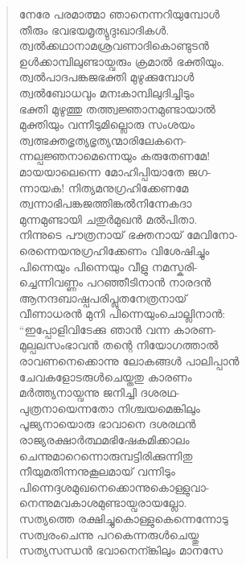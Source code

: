 \begin{verse}
നേരേ പരമാത്മാ ഞാനെന്നറിയുമ്പോള്‍\\
തീരും ഭവഭയമൃത്യുദുഃഖാദികള്‍.\\
ത്വല്‍ക്കഥാനാമശ്രവണാദികൊണ്ടുടന്‍\\
ഉള്‍ക്കാമ്പിലുണ്ടായ്വരും ക്രമാല്‍ ഭക്തിയും.\\
ത്വല്‍പാദപങ്കജഭക്തി മുഴുക്കുമ്പോള്‍\\
ത്വല്‍ബോധവും മനഃകാമ്പിലുദിച്ചിടും\\
ഭക്തി മുഴുത്തു തത്ത്വജ്ഞാനമുണ്ടായാല്‍\\
മുക്തിയും വന്നീടുമില്ലൊരു സംശയം\\
ത്വത്ഭക്തഭൃത്യഭൃത്യന്മാരിലേകനെ-\\
ന്നല്പജ്ഞനാമെന്നെയും കരുതേണമേ!\\
മായയാലെന്നെ മോഹിപ്പിയാതേ ജഗ-\\
ന്നായക! നിത്യമനുഗ്രഹിക്കേണമേ\\
ത്വന്നാഭിപങ്കജത്തിങ്കല്‍നിന്നേകദാ\\
മുന്നമുണ്ടായി ചതുര്‍മുഖന്‍ മല്‍പിതാ.\\
നിന്നുടെ പൗത്രനായ് ഭക്തനായ് മേവിനോ-\\
രെന്നെയനുഗ്രഹിക്കേണം വിശേഷിച്ചും\\
പിന്നെയും പിന്നെയും വീളു നമസ്കരി-\\
ച്ചെന്നിവണ്ണം പറഞ്ഞീടിനാന്‍ നാരദന്‍\\
ആനന്ദബാഷ്പപരിപ്ലുതനേത്രനായ്\\
വീണാധരന്‍ മുനി പിന്നെയുംചൊല്ലിനാന്‍:\\
“ഇപ്പോളിവിടേക്കു ഞാന്‍ വന്ന കാരണ-\\
മുല്പലസംഭാവന്‍ തന്റെ നിയോഗത്താല്‍\\
രാവണനെക്കൊന്നു ലോകങ്ങള്‍ പാലിപ്പാന്‍\\
ചേവകളോടരുള്‍ചെയ്തതു കാരണം\\
മര്‍ത്ത്യനായ്വന്നു ജനിച്ചി ദശരഥ-\\
പുത്രനായെന്നതോ നിശ്ചയമെങ്കിലും\\
പൂജ്യനായൊരു ഭാവാനെ ദശരഥന്‍\\
രാജ്യരക്ഷാര്‍ത്ഥമഭിഷേകമിക്കാലം\\
ചെന്നുമാറെന്നൊരുമ്പട്ടിരിക്കുന്നിതു\\
നീയുമതിന്നനുകൂലമായ് വന്നിടും\\
പിന്നെദ്ദശമുഖനെക്കൊന്നുകൊള്ളുവാ-\\
നെന്നുമവകാശമുണ്ടായ്വരായല്ലോ.\\
സത്യത്തെ രക്ഷിച്ചുകൊള്ളുകെന്നെന്നോടു\\
സത്വരംചെന്നു പറകെന്നരുള്‍ചെയ്തു\\
സത്യസന്ധന്‍ ഭവാനെന്ങ്കിലും മാനസേ\\

\end{verse}

